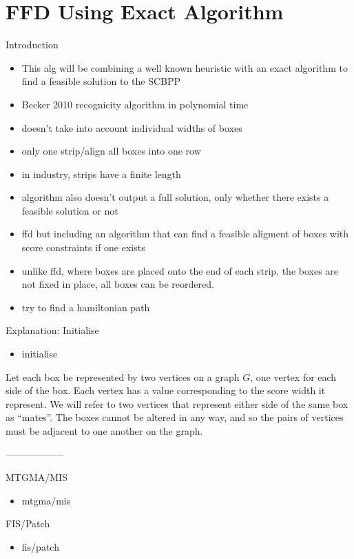 \documentclass[oribibl]{llncs}
\begin{document}
\section{FFD Using Exact Algorithm}
\label{sec:ffdexact}
Introduction
\begin{itemize}
	\item This alg will be combining a well known heuristic with an exact algorithm to find a feasible solution to the SCBPP
	\item Becker 2010 recognicity algorithm in polynomial time
	\item doesn't take into account individual widths of boxes
	\item only one strip/align all boxes into one row
	\item in industry, strips have a finite length
	\item algorithm also doesn't output a full solution, only whether there exists a feasible solution or not
	\item ffd but including an algorithm that can find a feasible aligment of boxes with score constraints if one exists
	\item unlike ffd, where boxes are placed onto the end of each strip, the boxes are not fixed in place, all boxes can be reordered.
	\item try to find a hamiltonian path 
\end{itemize}

Explanation: Initialise
\begin{itemize}
	\item initialise
\end{itemize}

Let each box be represented by two vertices on a graph $G$, one vertex for each side of the box. Each vertex has a value corresponding to the score width it represent. We will refer to two vertices that represent either side of the same box as ``mates''. The boxes cannot be altered in any way, and so the pairs of vertices must be adjacent to one another on the graph. 

------------------

MTGMA/MIS
\begin{itemize}
	\item mtgma/mis
\end{itemize}

FIS/Patch
\begin{itemize}
	\item fis/patch
\end{itemize}
\end{document}

